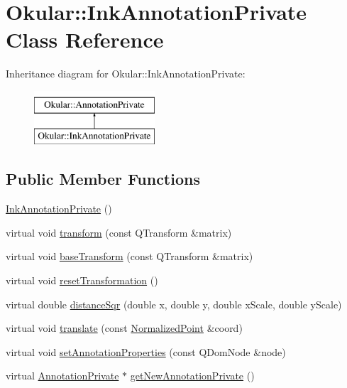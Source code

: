 \hypertarget{classOkular_1_1InkAnnotationPrivate}{\section{Okular\+:\+:Ink\+Annotation\+Private Class Reference}
\label{classOkular_1_1InkAnnotationPrivate}
}
Inheritance diagram for Okular\+:\+:Ink\+Annotation\+Private\+:\begin{figure}[H]
\begin{center}
\leavevmode
\includegraphics[height=2.000000cm]{classOkular_1_1InkAnnotationPrivate}
\end{center}
\end{figure}
\subsection*{Public Member Functions}
\begin{DoxyCompactItemize}
\item 
\hyperlink{classOkular_1_1InkAnnotationPrivate_aabdd401311e2a1a63dd839c86a772bb9}{Ink\+Annotation\+Private} ()
\item 
virtual void \hyperlink{classOkular_1_1InkAnnotationPrivate_a78f9b9eab6fbd31b9c3a25ead30a9655}{transform} (const Q\+Transform \&matrix)
\item 
virtual void \hyperlink{classOkular_1_1InkAnnotationPrivate_a84ad3342b3071b196c2fece3df1fe28b}{base\+Transform} (const Q\+Transform \&matrix)
\item 
virtual void \hyperlink{classOkular_1_1InkAnnotationPrivate_a00d8c9866a130243486e6113b769c3db}{reset\+Transformation} ()
\item 
virtual double \hyperlink{classOkular_1_1InkAnnotationPrivate_a559128b845516dcf6c2ee7b2e36c7ac2}{distance\+Sqr} (double x, double y, double x\+Scale, double y\+Scale)
\item 
virtual void \hyperlink{classOkular_1_1InkAnnotationPrivate_aa91e13aafee4a4134b729d5bff7dcd88}{translate} (const \hyperlink{classOkular_1_1NormalizedPoint}{Normalized\+Point} \&coord)
\item 
virtual void \hyperlink{classOkular_1_1InkAnnotationPrivate_a1c3320a8eecae7a3b6a43c2bf8b92199}{set\+Annotation\+Properties} (const Q\+Dom\+Node \&node)
\item 
virtual \hyperlink{classOkular_1_1AnnotationPrivate}{Annotation\+Private} $\ast$ \hyperlink{classOkular_1_1InkAnnotationPrivate_ada96d120eee90618075fb3bf6e4c1a03}{get\+New\+Annotation\+Private} ()
\end{DoxyCompactItemize}
